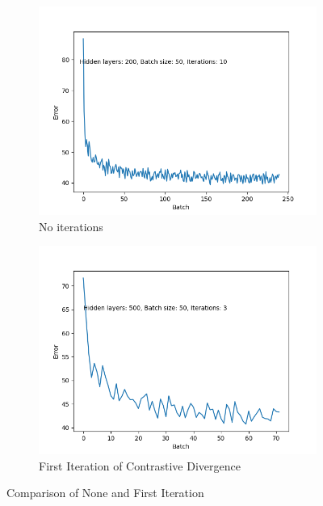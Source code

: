 \documentclass[a4paper]{article}
\begin{document}
\begin{figure}[htb]
    \centering
    \begin{subfigure}[b]{0.45\textwidth}
        \centering
        \includegraphics[width=\textwidth]{Labs/Lab 4/Rakin/plots/Hidden_layers_200_batch_50_iterations_10.png}
        \caption{No iterations}
        \label{fig:Lab4-iter1}
    \end{subfigure}
    \begin{subfigure}[b]{0.45\textwidth}
        \centering
        \includegraphics[width=\textwidth]{Labs/Lab 4/Rakin/plots/Hidden_layers_500_batch_50_iterations_3.png}
        \caption{First Iteration of Contrastive Divergence}
        \label{fig:Lab4-iter2}
    \end{subfigure}
    \caption{Comparison of None and First Iteration}
    \label{fig:Lab4-comparison-hiddenNodes}
\end{figure}
\end{document}

